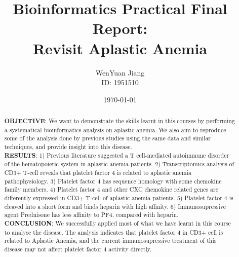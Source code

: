 \documentclass[en,black,12pt,normal]{elegantpaper}
\title{Bioinformatics Practical Final Report:\\Revisit Aplastic Anemia}
\author{WenYuan Jiang\\ID: 1951510}
\institute{School of Life Science, Tongji University}
\date{\today}
\begin{document}
\maketitle

\begin{abstract}
\textbf{OBJECTIVE}: We want to demonstrate the skills learnt in this courses by performing a systematical bioinformatics analysis on aplastic anemia. We also aim to reproduce some of the analysis done by previous studies using the same data and similar techniques, and provide insight into this disease.\\
\textbf{RESULTS}: 1) Previous literature suggested a T cell-mediated autoimmune disorder of the hematopoietic system in aplastic anemia patients. 2) Transcriptomics analysis of CD3+ T-cell reveals that platelet factor 4 is related to aplastic anemia pathophysiology. 3) Platelet factor 4 has sequence homology with some chemokine family members. 4) Platelet factor 4 and other CXC chemokine related genes are differently expressed in CD3+ T-cell of aplastic anemia patients. 5) Platelet factor 4 is cleaved into a short form and binds heparin with high affinity. 6) Immunosupressive agent Prednisone has less affinity to PF4, compared with heparin.\\
\textbf{CONCLUSION}: We successfully applied most of what we have learnt in this course to analyse the disease. The analysis indicates that platelet factor 4 in CD3+ cell is related to Aplastic Anemia, and the current immunosupressive treatment of this disease may not affect platelet factor 4 activity directly. 
\end{abstract}


\tableofcontents









{}
\end{document}
